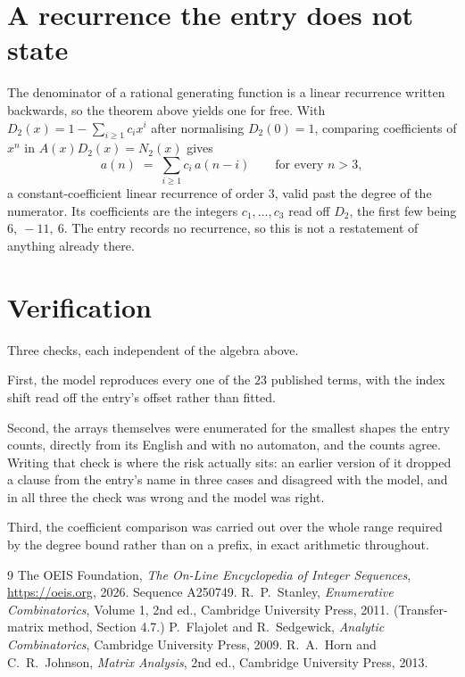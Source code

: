 \documentclass[11pt,a4paper]{article}
\theoremstyle{plain}
\theoremstyle{definition}
\begin{document}
\section{A recurrence the entry does not state}

The denominator of a rational generating function is a linear recurrence written backwards, so
the theorem above yields one for free. With $D_2(x)=1-\sum_{i\ge1}c_ix^i$ after normalising
$D_2(0)=1$, comparing coefficients of $x^n$ in $A(x)D_2(x)=N_2(x)$ gives
\[
a(n)\;=\;\sum_{i\ge1}c_i\,a(n-i)\qquad\text{for every }n>3,
\]
a constant-coefficient linear recurrence of order $3$, valid past the degree of the
numerator. Its coefficients are the integers $c_1,\dots,c_{3}$ read off $D_2$, the first few being $6,\ -11,\ 6$. The entry records no recurrence, so this is not a restatement of anything
already there.

\section{Verification}

Three checks, each independent of the algebra above.

First, the model reproduces every one of the $23$ published terms, with the index shift
read off the entry's offset rather than fitted.

Second, the arrays themselves were enumerated for the smallest shapes the entry counts,
directly from its English and with no automaton, and the counts agree. Writing that check is
where the risk actually sits: an earlier version of it dropped a clause from the entry's name
in three cases and disagreed with the model, and in all three the check was wrong and the model
was right.

Third, the coefficient comparison was carried out over the whole range required by the degree
bound rather than on a prefix, in exact arithmetic throughout.

\begin{thebibliography}{9}
 The OEIS Foundation, \emph{The On-Line Encyclopedia of Integer
Sequences}, \url{https://oeis.org}, 2026. Sequence A250749.
 R.~P.~Stanley, \emph{Enumerative Combinatorics}, Volume 1, 2nd ed.,
Cambridge University Press, 2011. (Transfer-matrix method, Section 4.7.)
 P.~Flajolet and R.~Sedgewick, \emph{Analytic Combinatorics}, Cambridge
University Press, 2009.
 R.~A.~Horn and C.~R.~Johnson, \emph{Matrix Analysis}, 2nd ed., Cambridge
University Press, 2013.
\end{thebibliography}
\end{document}
